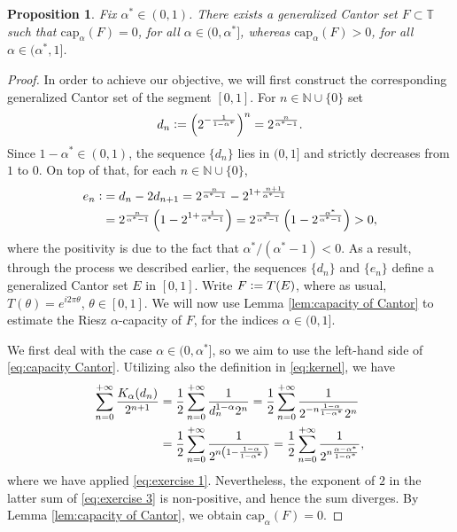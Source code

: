 \documentclass[12pt]{amsart}
\newtheorem{proposition}[theorem]{Proposition}
\theoremstyle{definition}\newtheorem{remark}[theorem]{Remark}
\theoremstyle{definition}\newtheorem{example}[theorem]{Example}
\theoremstyle{definition}\newtheorem{definition}{Definition}
\numberwithin{equation}{section}
\newcommand\TT{{\mathbb T}}
\begin{document}
\begin{proposition}\label{prop:cantor closed}
    Fix $\alpha^*\in(0,1)$. There exists a generalized Cantor set $F\subset\TT$ such that $\mathrm{cap}_\alpha(F)=0$, for all $\alpha\in(0,\alpha^*]$, whereas $\mathrm{cap}_\alpha(F)>0$, for all $\alpha\in(\alpha^*,1]$.
\end{proposition}
\begin{proof}
In order to achieve our objective, we will first construct the corresponding generalized Cantor set of the segment $[0,1]$. For $n\in\mathbb{N}\cup\{0\}$ set 
\begin{equation}\label{eq:exercise 1}
   d_n\vcentcolon=\left(2^{-\frac{1}{1-\alpha^*}}\right)^n=2^\frac{n}{\alpha^*-1}. 
\end{equation}
Since $1-\alpha^*\in(0,1)$, the sequence $\{d_n\}$ lies in $(0,1]$ and strictly decreases from $1$ to $0$. On top of that, for each $n\in\mathbb{N}\cup\{0\}$,
\begin{align}\label{eq:exercise 2}
\notag    e_n\vcentcolon&=d_n-2d_{n+1}=2^\frac{n}{\alpha^*-1}-2^{1+\frac{n+1}{\alpha^*-1}}\\
  &=2^\frac{n}{\alpha^*-1}\left(1-2^{1+\frac{1}{\alpha^*-1}}\right)=2^\frac{n}{\alpha^*-1}\left(1-2^{\frac{\alpha^*}{\alpha^*-1}}\right)>0,
\end{align}
where the positivity is due to the fact that $\alpha^*/(\alpha^*-1)<0$. As a result, through the process we described earlier, the sequences $\{d_n\}$ and $\{e_n\}$ define a generalized Cantor set $E$ in $[0,1]$. Write $F\vcentcolon=T(E)$, where as usual, $T(\theta)=e^{i2\pi\theta}$, $\theta\in[0,1]$. We will now use Lemma \ref{lem:capacity of Cantor} to estimate the Riesz $\alpha$-capacity of $F$, for the indices $\alpha\in(0,1]$.

We first deal with the case $\alpha\in(0,\alpha^*]$, so we aim to use the left-hand side of \eqref{eq:capacity Cantor}. Utilizing also the definition in \eqref{eq:kernel}, we have
\begin{align}\label{eq:exercise 3}
 \notag   \sum_{n=0}^{+\infty}\frac{K_\alpha(d_n)}{2^{n+1}}&=\frac{1}{2}\sum_{n=0}^{+\infty}\frac{1}{d_n^{1-\alpha}2^n}=\frac{1}{2}\sum_{n=0}^{+\infty}\frac{1}{2^{-n\frac{1-\alpha}{1-\alpha^*}}2^n}\\
    &=\frac{1}{2}\sum_{n=0}^{+\infty}\frac{1}{2^{n\left(1-\frac{1-\alpha}{1-\alpha^*}\right)}}=\frac{1}{2}\sum_{n=0}^{+\infty}\frac{1}{2^{n\frac{\alpha-\alpha^*}{1-\alpha^*}}},
\end{align}
where we have applied \eqref{eq:exercise 1}. Nevertheless, the exponent of $2$ in the latter sum of \eqref{eq:exercise 3} is non-positive, and hence the sum diverges. By Lemma \ref{lem:capacity of Cantor}, we obtain $\mathrm{cap}_\alpha(F)=0$.


\end{proof}
\end{document}
